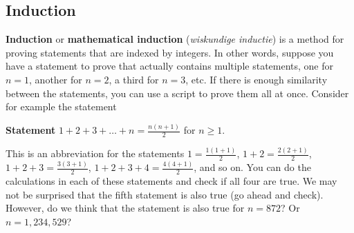 \subsection{Induction}
\textbf{Induction} or \textbf{mathematical induction} (\textit{wiskundige inductie}) is a method for proving statements that are indexed by integers. In other words, suppose you have a statement to prove that actually contains multiple statements, one for $n=1$, another for $n=2$, a third for $n=3$, etc. If there is enough similarity between the statements, you can use a script to prove them all at once. 
%
Consider for example the statement
%

{\bf Statement}  $1+2+3+\dots+n=\frac{n(n+1)}{2}$ for $n\geq 1$.


This is an abbreviation for the statements $1=\frac{1(1+1)}{2}$, $1+2=\frac{2(2+1)}{2}$, $1+2+3= \frac{3(3+1)}{2}$, $1+2+3+4=\frac{4(4+1)}{2}$, and so on. You can do the calculations in each of these statements and check if all four are true. We may not be surprised that the fifth statement is also true (go ahead and check). However, do we think that the statement is also true for $n=872$? Or $n=1,234,529$?

